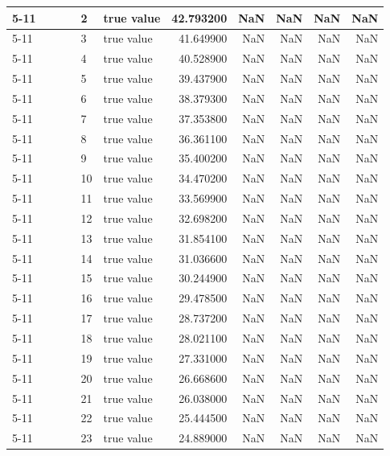 \begin{tabular}{llllllrrrrr}
\cline{5-11}
 &  &  &  & 2 & true value & 42.793200 & NaN & NaN & NaN & NaN \\
\cline{5-11}
 &  &  &  & 3 & true value & 41.649900 & NaN & NaN & NaN & NaN \\
\cline{5-11}
 &  &  &  & 4 & true value & 40.528900 & NaN & NaN & NaN & NaN \\
\cline{5-11}
 &  &  &  & 5 & true value & 39.437900 & NaN & NaN & NaN & NaN \\
\cline{5-11}
 &  &  &  & 6 & true value & 38.379300 & NaN & NaN & NaN & NaN \\
\cline{5-11}
 &  &  &  & 7 & true value & 37.353800 & NaN & NaN & NaN & NaN \\
\cline{5-11}
 &  &  &  & 8 & true value & 36.361100 & NaN & NaN & NaN & NaN \\
\cline{5-11}
 &  &  &  & 9 & true value & 35.400200 & NaN & NaN & NaN & NaN \\
\cline{5-11}
 &  &  &  & 10 & true value & 34.470200 & NaN & NaN & NaN & NaN \\
\cline{5-11}
 &  &  &  & 11 & true value & 33.569900 & NaN & NaN & NaN & NaN \\
\cline{5-11}
 &  &  &  & 12 & true value & 32.698200 & NaN & NaN & NaN & NaN \\
\cline{5-11}
 &  &  &  & 13 & true value & 31.854100 & NaN & NaN & NaN & NaN \\
\cline{5-11}
 &  &  &  & 14 & true value & 31.036600 & NaN & NaN & NaN & NaN \\
\cline{5-11}
 &  &  &  & 15 & true value & 30.244900 & NaN & NaN & NaN & NaN \\
\cline{5-11}
 &  &  &  & 16 & true value & 29.478500 & NaN & NaN & NaN & NaN \\
\cline{5-11}
 &  &  &  & 17 & true value & 28.737200 & NaN & NaN & NaN & NaN \\
\cline{5-11}
 &  &  &  & 18 & true value & 28.021100 & NaN & NaN & NaN & NaN \\
\cline{5-11}
 &  &  &  & 19 & true value & 27.331000 & NaN & NaN & NaN & NaN \\
\cline{5-11}
 &  &  &  & 20 & true value & 26.668600 & NaN & NaN & NaN & NaN \\
\cline{5-11}
 &  &  &  & 21 & true value & 26.038000 & NaN & NaN & NaN & NaN \\
\cline{5-11}
 &  &  &  & 22 & true value & 25.444500 & NaN & NaN & NaN & NaN \\
\cline{5-11}
 &  &  &  & 23 & true value & 24.889000 & NaN & NaN & NaN & NaN \\

\end{tabular}
